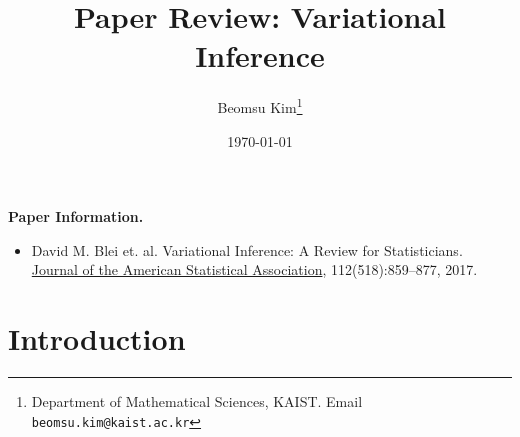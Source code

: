 \documentclass[10pt]{article}
\title{Paper Review: Variational Inference}
\author{Beomsu Kim\footnote{Department of Mathematical Sciences, KAIST. Email \texttt{beomsu.kim@kaist.ac.kr}}}
\date{\today}
\begin{document}
\maketitle

\textbf{Paper Information.}

\begin{itemize}
\item David M. Blei et. al. Variational Inference: A Review for Statisticians. \\ \underline{Journal of the American Statistical Association}, 112(518):859--877, 2017.
\end{itemize}

\section{Introduction}
\end{document}

